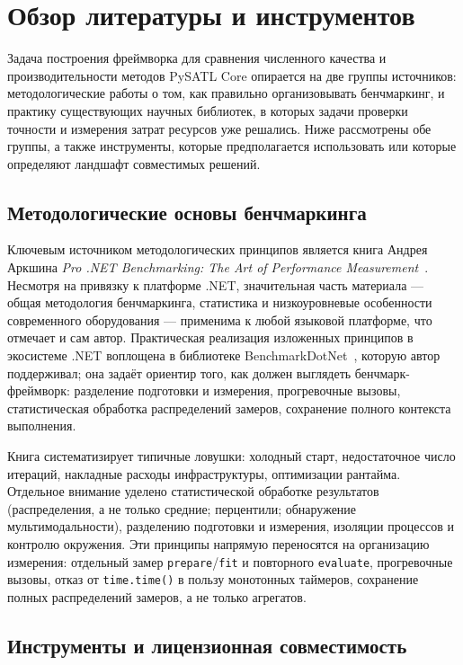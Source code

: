 \documentclass[12pt,a4paper]{article}
\begin{document}
\section{Обзор литературы и инструментов}
\label{sec:review}

Задача построения фреймворка для сравнения численного качества
и производительности методов PySATL Core опирается на две группы
источников: методологические работы о том, как правильно организовывать
бенчмаркинг, и практику существующих научных библиотек, в которых
задачи проверки точности и измерения затрат ресурсов уже решались.
Ниже рассмотрены обе группы, а также инструменты, которые
предполагается использовать или которые определяют ландшафт
совместимых решений.

\subsection{Методологические основы бенчмаркинга}

Ключевым источником методологических принципов является книга
Андрея Аркшина \textit{Pro .NET Benchmarking: The Art of Performance
Measurement}~\cite{arkshin2019}. Несмотря на привязку к платформе
.NET, значительная часть материала --- общая методология бенчмаркинга,
статистика и низкоуровневые особенности современного оборудования ---
применима к любой языковой платформе, что отмечает и сам автор.
Практическая реализация изложенных принципов в экосистеме .NET
воплощена в библиотеке BenchmarkDotNet~\cite{benchmarkdotnet},
которую автор поддерживал; она задаёт ориентир того, как должен
выглядеть бенчмарк-фреймворк: разделение подготовки и измерения,
прогревочные вызовы, статистическая обработка распределений замеров,
сохранение полного контекста выполнения.

Книга систематизирует типичные ловушки: холодный старт, недостаточное
число итераций, накладные расходы инфраструктуры, оптимизации
рантайма. Отдельное внимание уделено статистической обработке
результатов (распределения, а не только средние; перцентили;
обнаружение мультимодальности), разделению подготовки и измерения,
изоляции процессов и контролю окружения. Эти принципы напрямую
переносятся на организацию измерения: отдельный замер
\texttt{prepare}/\texttt{fit} и повторного \texttt{evaluate},
прогревочные вызовы, отказ от \texttt{time.time()} в пользу
монотонных таймеров, сохранение полных распределений замеров,
а не только агрегатов.

\subsection{Инструменты и лицензионная совместимость}
\end{document}
